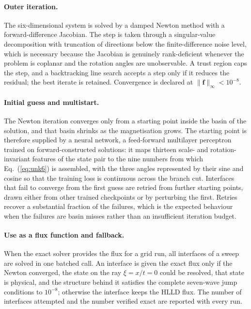 \paragraph{Outer iteration.}
The six-dimensional system is solved by a damped Newton method with a
forward-difference Jacobian. The step is taken through a singular-value
decomposition with truncation of directions below the finite-difference noise
level, which is necessary because the Jacobian is genuinely rank-deficient
whenever the problem is coplanar and the rotation angles are unobservable. A
trust region caps the step, and a backtracking line search accepts a step only
if it reduces the residual; the best iterate is retained. Convergence is
declared at $\lVert \mathbf{f} \rVert_\infty < 10^{-8}$.

\paragraph{Initial guess and multistart.}
The Newton iteration converges only from a starting point inside the basin of
the solution, and that basin shrinks as the magnetisation grows. The starting
point is therefore supplied by a neural network, a feed-forward
multilayer perceptron trained on forward-constructed solutions: it maps
thirteen scale- and rotation-invariant features of the state pair to the nine
numbers from which Eq.~(\ref{eq:unk6}) is assembled, with the three angles
represented by their sine and cosine so that the training loss is continuous
across the branch cut. Interfaces that fail to converge from the first guess
are retried from further starting points, drawn either from other trained
checkpoints or by perturbing the first. Retries recover a substantial fraction
of the failures, which is the expected behaviour when the failures are basin
misses rather than an insufficient iteration budget.

\paragraph{Use as a flux function and fallback.}
When the exact solver provides the flux for a grid run, all interfaces of a
sweep are solved in one batched call. An interface is given the exact flux
only if the Newton converged, the state on the ray $\xi = x/t = 0$ could be
resolved, that state is physical, and the structure behind it satisfies the
complete seven-wave jump conditions to $10^{-8}$; otherwise the interface
keeps the HLLD flux. The number of interfaces attempted and the number
verified exact are reported with every run.

